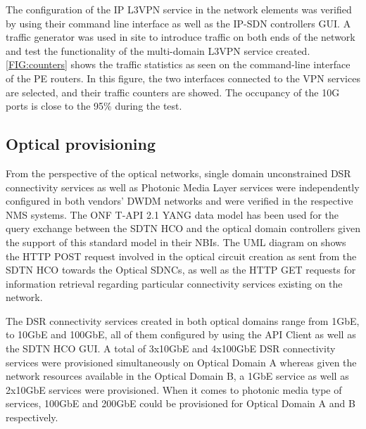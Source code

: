\documentclass[a4paper,fleqn]{cas-dc}
\begin{document}
The configuration of the IP L3VPN service in the network elements was verified by using their command line interface as well as the IP-SDN controllers GUI. A traffic generator was used in site to introduce traffic on both ends of the network and test the functionality of the multi-domain L3VPN service created.\cref{FIG:counters} shows the traffic statistics as seen on the command-line interface of the PE routers. In this figure, the two interfaces connected to the VPN services are selected, and their traffic counters are showed. The occupancy of the 10G ports is close to the 95\% during the test. 

\subsection{Optical provisioning}
From the perspective of the optical networks, single domain unconstrained DSR connectivity services as well as Photonic Media Layer services were independently configured in both vendors’ DWDM networks and were verified in the respective NMS systems. The ONF T-API 2.1 YANG data model has been used for the query exchange between the SDTN HCO and the optical domain controllers given the support of this standard model in their NBIs. The UML diagram on  shows the HTTP POST request involved in the optical circuit creation as sent from the SDTN HCO towards the Optical SDNCs, as well as the HTTP GET requests for information retrieval regarding particular connectivity services existing on the network. 

The DSR connectivity services created in both optical domains range from 1GbE, to 10GbE and 100GbE, all of them configured by using the API Client as well as the SDTN HCO GUI. A total of 3x10GbE and 4x100GbE DSR connectivity services were provisioned simultaneously on Optical Domain A whereas given the network resources available in the Optical Domain B, a 1GbE service as well as 2x10GbE services were provisioned. When it comes to photonic media type of services, 100GbE and 200GbE could be provisioned for Optical Domain A and B respectively. 
\end{document}
